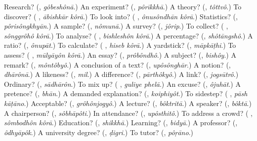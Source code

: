 \begin{tcolorbox}[breakable,colback=teal!4,colframe=teal!35!black,title={Before you move on}]
Research? (\textbf{}, \emph{gôbeshônā}.) An experiment? (\textbf{}, \emph{pôrīkkhā}.) A theory? (\textbf{}, \emph{tôttvô}.) To discover? (\textbf{ }, \emph{ābishkār kôrā}.) To look into? (\textbf{ }, \emph{ônusôndhān kôrā}.) Statistics? (\textbf{}, \emph{pôrisôngkhyān}.) A sample? (\textbf{}, \emph{nômunā}.) A survey? (\textbf{}, \emph{jôrip}.) To collect? (\textbf{ }, \emph{sônggrôhô kôrā}.) To analyse? (\textbf{ }, \emph{bishleshôn kôrā}.) A percentage? (\textbf{}, \emph{shôtāngshô}.) A ratio? (\textbf{}, \emph{ônupāt}.) To calculate? (\textbf{ }, \emph{hiseb kôrā}.) A yardstick? (\textbf{}, \emph{māpkāṭhi}.) To assess? (\textbf{ }, \emph{mūlyāyôn kôrā}.) An essay? (\textbf{}, \emph{prôbôndhô}.) A subject? (\textbf{}, \emph{bishôy}.) A remark? (\textbf{}, \emph{môntôbyô}.) A conclusion of a text? (\textbf{}, \emph{upôsônghār}.) A notion? (\textbf{}, \emph{dhārônā}.) A likeness? (\textbf{}, \emph{mil}.) A difference? (\textbf{}, \emph{pārthôkyô}.) A link? (\textbf{}, \emph{jogsūtrô}.) Ordinary? (\textbf{}, \emph{sādhārôn}.) To mix up? (\textbf{ }, \emph{guliye phelā}.) An excuse? (\textbf{}, \emph{ôjuhāt}.) A pretence? (\textbf{}, \emph{bhān}.) A demanded explanation? (\textbf{}, \emph{koiphiyôt}.) To sidestep? (\textbf{ }, \emph{pāsh kāṭāno}.) Acceptable? (\textbf{}, \emph{grôhônjogyô}.) A lecture? (\textbf{}, \emph{bôktritā}.) A speaker? (\textbf{}, \emph{bôktā}.) A chairperson? (\textbf{}, \emph{sôbhāpôti}.) In attendance? (\textbf{}, \emph{upôsthitô}.) To address a crowd? (\textbf{ }, \emph{sômbodhôn kôrā}.) Education? (\textbf{}, \emph{shikkhā}.) Learning? (\textbf{}, \emph{bidyā}.) A professor? (\textbf{}, \emph{ôdhyāpôk}.) A university degree? (\textbf{}, \emph{ḍigri}.) To tutor? (\textbf{}, \emph{pôṛāno}.)
\end{tcolorbox}
